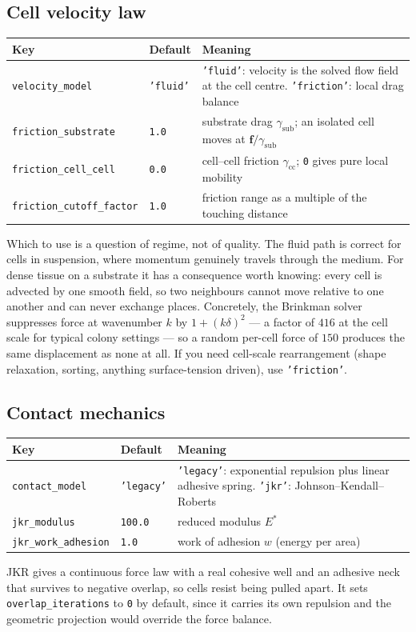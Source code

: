 \documentclass[11pt]{article}
\newcommand{\code}[1]{\texttt{#1}}
\begin{document}
\subsection{Cell velocity law}
\begin{longtable}{p{} p{} p{}}
\toprule
Key & Default & Meaning \\ \midrule \endhead
\code{velocity\_model} & \code{'fluid'} & \code{'fluid'}: velocity is the solved
  flow field at the cell centre. \code{'friction'}: local drag balance \\
\code{friction\_substrate} & \code{1.0} & substrate drag $\gamma_{\text{sub}}$;
  an isolated cell moves at $\mathbf{f}/\gamma_{\text{sub}}$ \\
\code{friction\_cell\_cell} & \code{0.0} & cell--cell friction
  $\gamma_{\text{cc}}$; \code{0} gives pure local mobility \\
\code{friction\_cutoff\_factor} & \code{1.0} & friction range as a multiple of
  the touching distance \\
\bottomrule
\end{longtable}
Which to use is a question of regime, not of quality. The fluid path is correct
for cells in suspension, where momentum genuinely travels through the medium.
For dense tissue on a substrate it has a consequence worth knowing: every cell is
advected by one smooth field, so two neighbours cannot move relative to one
another and can never exchange places. Concretely, the Brinkman solver suppresses
force at wavenumber $k$ by $1+(k\delta)^2$ --- a factor of $416$ at the cell scale
for typical colony settings --- so a random per-cell force of $150$ produces the
same displacement as none at all. If you need cell-scale rearrangement (shape
relaxation, sorting, anything surface-tension driven), use \code{'friction'}.

\subsection{Contact mechanics}
\begin{longtable}{p{} p{} p{}}
\toprule
Key & Default & Meaning \\ \midrule \endhead
\code{contact\_model} & \code{'legacy'} & \code{'legacy'}: exponential repulsion
  plus linear adhesive spring. \code{'jkr'}: Johnson--Kendall--Roberts \\
\code{jkr\_modulus} & \code{100.0} & reduced modulus $E^\ast$ \\
\code{jkr\_work\_adhesion} & \code{1.0} & work of adhesion $w$ (energy per area) \\
\bottomrule
\end{longtable}
JKR gives a continuous force law with a real cohesive well and an adhesive neck
that survives to negative overlap, so cells resist being pulled apart. It sets
\code{overlap\_iterations} to \code{0} by default, since it carries its own
repulsion and the geometric projection would override the force balance.
\end{document}
